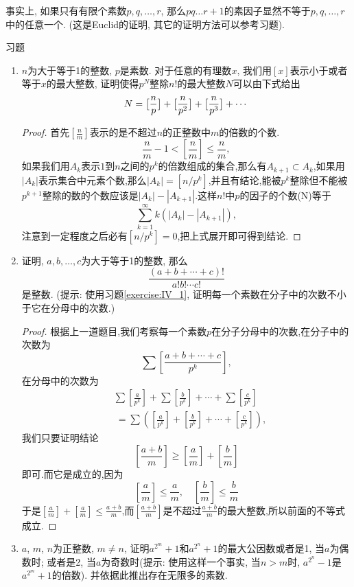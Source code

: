 \documentclass[12pt,a4paper]{book} %
\theoremstyle{remark}
\theoremstyle{example}
\theoremstyle{lemma}
\theoremstyle{corollary}
\numberwithin{theorem}{chapter}
\begin{document}
事实上, 如果只有有限个素数$p, q, \ldots, r$, 那么$pq \ldots r + 1$的素因子显然不等于$p, q, \ldots, r$中的任意一个. (这是Euclid的证明, 其它的证明方法可以参考习题).

习题

\begin{enumerate}
\item \label{exercise:IV_1} $n$为大于等于1的整数, $p$是素数. 对于任意的有理数$x$, 我们用$[x]$表示小于或者等于$x$的最大整数, 证明使得$p^N$整除$n!$的最大整数$N$可以由下式给出
\[
N = \big{[}\frac{n}{p}\big{]} + \big{[}\frac{n}{p^2}\big{]} + \big{[}\frac{n}{p^3}\big{]} + \cdots
\]

\begin{proof}
首先$[\frac{n}{m}]$表示的是不超过$n$的正整数中$m$的倍数的个数.
\[
\frac{n}{m} - 1 < [\frac{n}{m}] \le \frac{n}{m},
\]
如果我们用$A_k$表示$1$到$n$之间的$p^k$的倍数组成的集合,那么有$A_{k+1} \subset A_{k}$,如果用$|A_k|$表示集合中元素个数,那么$|A_k| = [n/p^k]$,并且有结论,能被$p^k$整除但不能被$p^{k+1}$整除的数的个数应该是$|A_k|-|A_{k+1}|$.这样$n!$中$p$的因子的个数(N)等于
\[
\sum_{k=1}^{\infty}{k(|A_k| - |A_{k+1}|)},
\]
注意到一定程度之后必有$[n/p^k]=0$,把上式展开即可得到结论.
\end{proof}

\item \label{exercise:IV_2} 证明, $a, b, \ldots, c$为大于等于1的整数, 那么
\[
\frac{(a + b + \cdots + c)!}{a!b! \cdots c!}
\]
是整数. (提示: 使用习题\ref{exercise:IV_1}, 证明每一个素数在分子中的次数不小于它在分母中的次数.)

\begin{proof}
根据上一道题目,我们考察每一个素数$p$在分子分母中的次数,在分子中的次数为
\[
\sum{[\frac{a+b+\cdots+c}{p^k}]},
\]
在分母中的次数为
\[
\begin{aligned}
&\sum{[\frac{a}{p^k}]} + \sum{[\frac{b}{p^k}]} + \cdots + \sum{[\frac{c}{p^k}]} \\
&\ = \sum{([\frac{a}{p^k}] + [\frac{b}{p^k}] + \cdots + [\frac{c}{p^k}])},
\end{aligned}
\]
我们只要证明结论
\[
[\frac{a+b}{m}] \ge [\frac{a}{m}] + [\frac{b}{m}]
\]
即可.而它是成立的,因为
\[
[\frac{a}{m}] \le \frac{a}{m}, \quad [\frac{b}{m}] \le \frac{b}{m}
\]
于是$[\frac{a}{m}] + [\frac{a}{m}] \le \frac{a+b}{m}$,而$[\frac{a+b}{m}]$是不超过$\frac{a+b}{m}$的最大整数,所以前面的不等式成立.
\end{proof}

\item \label{exercise:IV_3} $a$, $m$, $n$为正整数, $m \neq n$, 证明$a^{2^m} + 1$和$a^{2^n} + 1$的最大公因数或者是1, 当$a$为偶数时; 或者是2, 当$a$为奇数时(提示: 使用这样一个事实, 当$n > m$时, $a^{2^n} - 1$是$a^{2^m} + 1$的倍数). 并依据此推出存在无限多的素数.


\end{enumerate}
\end{document}
